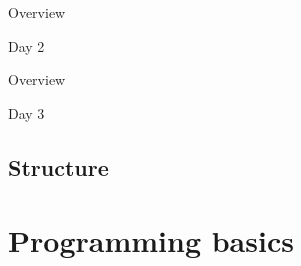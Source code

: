 \documentclass[xcolor=table,compress]{beamer}
\begin{document}
\begin{frame}{Overview}
\begin{block}{Day 2}

\end{block}
\end{frame}

\begin{frame}{Overview}
\begin{block}{Day 3}

\end{block}
\end{frame}

\subsection{Structure}

\section[Basics]{Programming basics}
\end{document}
